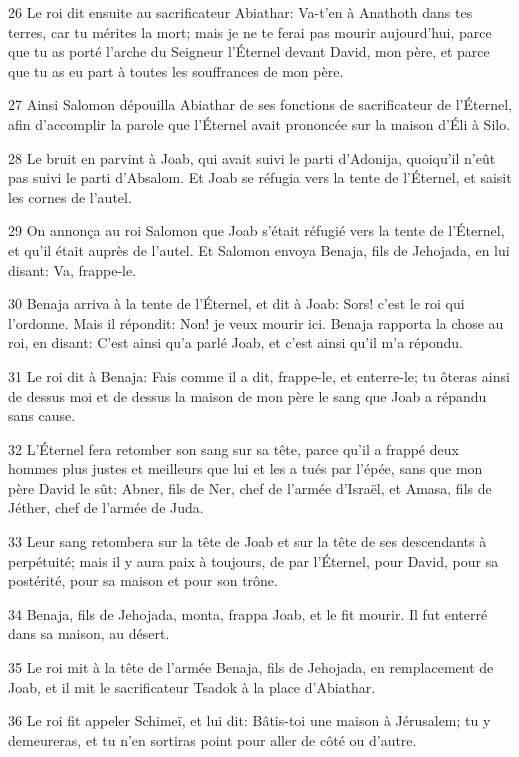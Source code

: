 \par 26 Le roi dit ensuite au sacrificateur Abiathar: Va-t'en à Anathoth dans tes terres, car tu mérites la mort; mais je ne te ferai pas mourir aujourd'hui, parce que tu as porté l'arche du Seigneur l'Éternel devant David, mon père, et parce que tu as eu part à toutes les souffrances de mon père.
\par 27 Ainsi Salomon dépouilla Abiathar de ses fonctions de sacrificateur de l'Éternel, afin d'accomplir la parole que l'Éternel avait prononcée sur la maison d'Éli à Silo.
\par 28 Le bruit en parvint à Joab, qui avait suivi le parti d'Adonija, quoiqu'il n'eût pas suivi le parti d'Absalom. Et Joab se réfugia vers la tente de l'Éternel, et saisit les cornes de l'autel.
\par 29 On annonça au roi Salomon que Joab s'était réfugié vers la tente de l'Éternel, et qu'il était auprès de l'autel. Et Salomon envoya Benaja, fils de Jehojada, en lui disant: Va, frappe-le.
\par 30 Benaja arriva à la tente de l'Éternel, et dit à Joab: Sors! c'est le roi qui l'ordonne. Mais il répondit: Non! je veux mourir ici. Benaja rapporta la chose au roi, en disant: C'est ainsi qu'a parlé Joab, et c'est ainsi qu'il m'a répondu.
\par 31 Le roi dit à Benaja: Fais comme il a dit, frappe-le, et enterre-le; tu ôteras ainsi de dessus moi et de dessus la maison de mon père le sang que Joab a répandu sans cause.
\par 32 L'Éternel fera retomber son sang sur sa tête, parce qu'il a frappé deux hommes plus justes et meilleurs que lui et les a tués par l'épée, sans que mon père David le sût: Abner, fils de Ner, chef de l'armée d'Israël, et Amasa, fils de Jéther, chef de l'armée de Juda.
\par 33 Leur sang retombera sur la tête de Joab et sur la tête de ses descendants à perpétuité; mais il y aura paix à toujours, de par l'Éternel, pour David, pour sa postérité, pour sa maison et pour son trône.
\par 34 Benaja, fils de Jehojada, monta, frappa Joab, et le fit mourir. Il fut enterré dans sa maison, au désert.
\par 35 Le roi mit à la tête de l'armée Benaja, fils de Jehojada, en remplacement de Joab, et il mit le sacrificateur Tsadok à la place d'Abiathar.
\par 36 Le roi fit appeler Schimeï, et lui dit: Bâtis-toi une maison à Jérusalem; tu y demeureras, et tu n'en sortiras point pour aller de côté ou d'autre.
